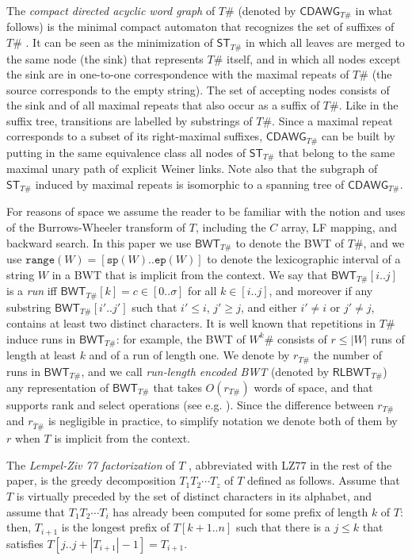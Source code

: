 \documentclass[a4paper,UKenglish]{lipics-v2016}
\newcommand{\REV}[1]{\ensuremath{\overline{#1}}}
\newcommand{\RLBWT}{\ensuremath{\mathsf{RLBWT}}}
\newcommand{\ST}{\ensuremath{\mathsf{ST}}}
\newcommand{\BWT}{\ensuremath{\mathsf{BWT}}}
\newcommand{\CDAWG}{\ensuremath{\mathsf{CDAWG}}}
\newcommand\SP[1]{\mathtt{sp}(#1)}
\newcommand\EP[1]{\mathtt{ep}(#1)}
\newcommand\INTERVAL[1]{\mathtt{range}(#1)}
\newcommand{\runs}{r}
\begin{document}
The \emph{compact directed acyclic word graph} of $T\#$ (denoted by $\CDAWG_{T\#}$ in what follows) is the minimal compact automaton that recognizes the set of suffixes of $T\#$ \cite{blumer1987complete,CrochemoreV97}. It can be seen as the minimization of $\ST_{T\#}$ in which all leaves are merged to the same node (the sink) that represents $T\#$ itself, and in which all nodes except the sink are in one-to-one correspondence with the maximal repeats of $T\#$ \cite{Raffinot2001} (the source corresponds to the empty string). The set of accepting nodes consists of the sink and of all maximal repeats that also occur as a suffix of $T\#$. Like in the suffix tree, transitions are labelled by substrings of $T\#$. Since a maximal repeat corresponds to a subset of its right-maximal suffixes, $\CDAWG_{T\#}$ can be built by putting in the same equivalence class all nodes of $\ST_{T\#}$ that belong to the same maximal unary path of explicit Weiner links. Note also that the subgraph of $\ST_{T\#}$ induced by maximal repeats is isomorphic to a spanning tree of $\CDAWG_{T\#}$.

For reasons of space we assume the reader to be familiar with the notion and uses of the Burrows-Wheeler transform of $T$, including the $C$ array, LF mapping, and backward search. In this paper we use $\BWT_{T\#}$ to denote the BWT of $T\#$, and we use $\INTERVAL{W} = [\SP{W}..\EP{W}]$ to denote the lexicographic interval of a string $W$ in a BWT that is implicit from the context. We say that $\BWT_{T\#}[i..j]$ is a \emph{run} iff $\BWT_{T\#}[k]=c \in [0..\sigma]$ for all $k \in [i..j]$, and moreover if any substring $\BWT_{T\#}[i'..j']$ such that $i' \leq i$, $j' \geq j$, and either $i' \neq i$ or $j' \neq j$, contains at least two distinct characters. It is well known that repetitions in $T\#$ induce runs in $\BWT_{T\#}$: for example, the BWT of $W^{k}\#$ consists of $r\leq |W|$ runs of length at least $k$ and of a run of length one. We denote by $\runs_{T\#}$ the number of runs in $\BWT_{T\#}$, and we call \emph{run-length encoded BWT} (denoted by $\RLBWT_{T\#}$) any representation of $\BWT_{T\#}$ that takes $O(\runs_{T\#})$ words of space, and that supports rank and select operations (see e.g. \cite{makinen2005succinct1,MakinenNSV10,SirenVMN08}). Since the difference between $\runs_{T\#}$ and $\runs_{\REV{T}\#}$ is negligible in practice, to simplify notation we denote both of them by $\runs$ when $T$ is implicit from the context.

The \emph{Lempel-Ziv 77 factorization} of $T$ \cite{ziv1977universal}, abbreviated with LZ77 in the rest of the paper, is the greedy decomposition $T_1 T_2 \cdots T_{z}$ of $T$ defined as follows. Assume that $T$ is virtually preceded by the set of distinct characters in its alphabet, and assume that $T_1 T_2 \cdots T_i$ has already been computed for some prefix of length $k$ of $T$: then, $T_{i+1}$ is the longest prefix of $T[k+1..n]$ such that there is a $j \leq k$ that satisfies $T[j..j+|T_{i+1}|-1] = T_{i+1}$. 
\end{document}
